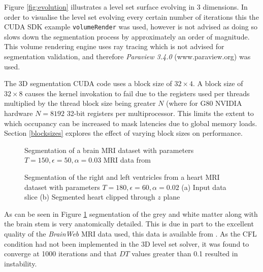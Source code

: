 Figure \ref{fig:evolution} illustrates a level set surface evolving in 3 dimensions. In order to visualise the level set evolving every certain number of iterations this the CUDA SDK example \texttt{volumeRender} was used, however is not advised as doing so slows down the segmentation process by approximately an order of magnitude. This volume rendering engine uses ray tracing which is not advised for segmentation validation, and therefore \textit{Paraview 3.4.0} (www.paraview.org) was used.

The 3D segmentation CUDA code uses a block size of $32 \times 4$. A block size of $32 \times 8$ causes the kernel invokation to fail due to the registers used per threads multiplied by the thread block size being greater $N$ (where for G80 NVIDIA hardware $N=8192$ 32-bit registers per multiprocessor. This limits the extent to which occupancy can be increased to mask latencies due to global memory loads. Section \ref{blocksizes} explores the effect of varying block sizes on performance.

\begin{figure}[p]
  \begin{center}
  \end{center}
  \caption{Segmentation of a brain MRI dataset with parameters $T = 150, \epsilon = 50, \alpha = 0.03$ MRI data from \cite{brainweb}}
  \label{fig:brain3d}
\end{figure}
\begin{figure}[p]
  \begin{center}
  \end{center}
  \caption{Segmentation of the right and left ventricles from a heart MRI dataset with parameters $T = 180, \epsilon = 60, \alpha = 0.02$ (a) Input data slice (b) Segmented heart clipped through $z$ plane}
  \label{fig:heart3d}
\end{figure}

As can be seen in Figure \ref{fig:brain3d} segmentation of the grey and white matter along with the brain stem is very anatomically detailed. This is due in part to the excellent quality of the \textit{BrainWeb} MRI data used, this data is available from \cite{brainweb}. As the CFL condition had not been implemented in the 3D level set solver, it was found to converge at 1000 iterations and that $DT$ values greater than 0.1 resulted in instability.

